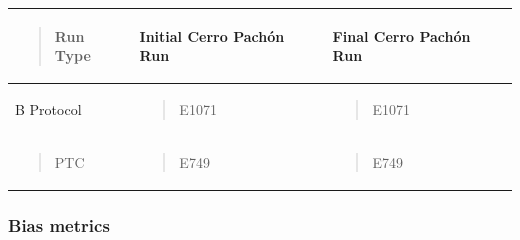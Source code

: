 \begin{longtable}[]{@{}
  >{\raggedright\arraybackslash}p{}
  >{\raggedright\arraybackslash}p{}
  >{\raggedright\arraybackslash}p{}@{}}
\toprule\noalign{}
\begin{minipage}[b]{\linewidth}\raggedright
\begin{quote}
Run Type
\end{quote}
\end{minipage} & \begin{minipage}[b]{\linewidth}\raggedright
Initial Cerro Pachón Run
\end{minipage} & \begin{minipage}[b]{\linewidth}\raggedright
Final Cerro Pachón Run
\end{minipage} \\
\midrule\noalign{}
\endhead
\bottomrule\noalign{}
\endlastfoot
B Protocol & \begin{minipage}[t]{\linewidth}\raggedright
\begin{quote}
E1071
\end{quote}
\end{minipage} & \begin{minipage}[t]{\linewidth}\raggedright
\begin{quote}
E1071
\end{quote}
\end{minipage} \\
\begin{minipage}[t]{\linewidth}\raggedright
\begin{quote}
PTC
\end{quote}
\end{minipage} & \begin{minipage}[t]{\linewidth}\raggedright
\begin{quote}
E749
\end{quote}
\end{minipage} & \begin{minipage}[t]{\linewidth}\raggedright
\begin{quote}
E749
\end{quote}
\end{minipage} \\
\end{longtable}

\subsubsection{Bias metrics}\label{bias-metrics-1}

